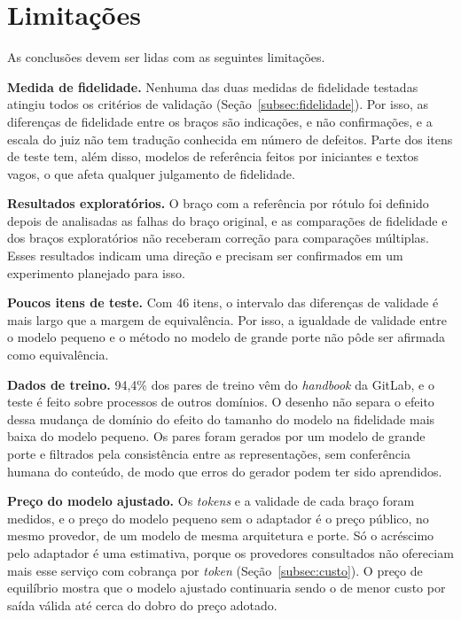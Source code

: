 \section{Limitações}\label{sec:limitacoes}

As conclusões devem ser lidas com as seguintes limitações.

\textbf{Medida de fidelidade.} Nenhuma das duas medidas de fidelidade testadas atingiu todos os critérios de validação (Seção~\ref{subsec:fidelidade}). Por isso, as diferenças de fidelidade entre os braços são indicações, e não confirmações, e a escala do juiz não tem tradução conhecida em número de defeitos. Parte dos itens de teste tem, além disso, modelos de referência feitos por iniciantes e textos vagos, o que afeta qualquer julgamento de fidelidade.

\textbf{Resultados exploratórios.} O braço com a referência por rótulo foi definido depois de analisadas as falhas do braço original, e as comparações de fidelidade e dos braços exploratórios não receberam correção para comparações múltiplas. Esses resultados indicam uma direção e precisam ser confirmados em um experimento planejado para isso.

\textbf{Poucos itens de teste.} Com 46 itens, o intervalo das diferenças de validade é mais largo que a margem de equivalência. Por isso, a igualdade de validade entre o modelo pequeno e o método no modelo de grande porte não pôde ser afirmada como equivalência.

\textbf{Dados de treino.} 94,4\% dos pares de treino vêm do \textit{handbook} da GitLab, e o teste é feito sobre processos de outros domínios. O desenho não separa o efeito dessa mudança de domínio do efeito do tamanho do modelo na fidelidade mais baixa do modelo pequeno. Os pares foram gerados por um modelo de grande porte e filtrados pela consistência entre as representações, sem conferência humana do conteúdo, de modo que erros do gerador podem ter sido aprendidos.

\textbf{Preço do modelo ajustado.} Os \textit{tokens} e a validade de cada braço foram medidos, e o preço do modelo pequeno sem o adaptador é o preço público, no mesmo provedor, de um modelo de mesma arquitetura e porte. Só o acréscimo pelo adaptador é uma estimativa, porque os provedores consultados não ofereciam mais esse serviço com cobrança por \textit{token} (Seção~\ref{subsec:custo}). O preço de equilíbrio mostra que o modelo ajustado continuaria sendo o de menor custo por saída válida até cerca do dobro do preço adotado.

